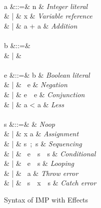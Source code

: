 \documentclass[letterpaper,10pt,onecolumn]{article}
\begin{document}
\begin{figure}
\begin{syntax}
\\
a &::=& n & \textit{Integer literal} \\
& | & x & \textit{Variable reference} \\
& | & a + a & \textit{Addition} \\
 \\
b &::=&  \\
& | &  \\
 \\
e &::=& b & \textit{Boolean literal} \\
& | & \ e & \textit{Negation} \\
& | & e\ \ e & \textit{Conjunction} \\
& | & a < a & \textit{Less} \\
 \\
s &::=&  & \textit{Noop} \\
& | & x \coloneqq a & \textit{Assignment} \\
& | & s\ ;\ s & \textit{Sequencing} \\
& | & \ e\ \ s\ \ s & \textit{Conditional} \\
& | & \ e\ \ s & \textit{Looping} \\
& | & \ a & \textit{Throw error} \\
& | & \ s\ \ x\ \ s & \textit{Catch error}
\end{syntax}
\caption{Syntax of IMP with Effects}
\label{fig:impsyn}
\end{figure}

\def \BigN {\infer [A-Num] { } {(S,n) \Downarrow_A n}}

\def \BigVar {\infer [A-Ref] { } {(S,x) \Downarrow_A S(x)}}

\def \BigAdd {\infer [A-Add] {(S,a) \Downarrow_A n \\ (S,a') \Downarrow_A n' } {(S,a+a') \Downarrow_A n+n'}}

\def \BigB {\infer [B-Bool] { } {(S,b) \Downarrow_B b}}

\def \BigNot {\infer [B-Not] {(S,e) \Downarrow_B b} {(S,\CCkeyw{not}\ e) \Downarrow_B \neg b}}

\def \BigAnd {\infer [B-And] {(S,e) \Downarrow_B b \\ (S,e') \Downarrow_B b'} {(S,e\ \CCkeyw{and}\ e') \Downarrow_B b \wedge b'}}
\end{document}
